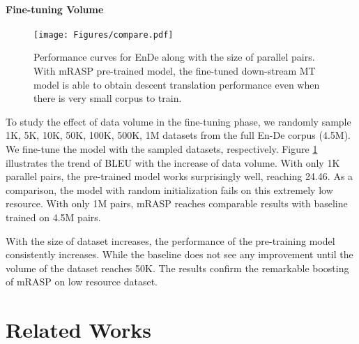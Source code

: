 \documentclass[11pt,a4paper]{article}
\newcommand{\method}{mRASP\xspace}
\begin{document}
\paragraph{Fine-tuning Volume}
\begin{figure}[ht]
    \centering
    \texttt{[image: Figures/compare.pdf]}
    \caption{Performance curves for EnDe along with the size of parallel pairs. With \method pre-trained model, the fine-tuned down-stream MT model is able to obtain descent translation performance even when there is very small corpus to train. }
    \label{fig:compare}
\end{figure}

To study the effect of data volume in the fine-tuning phase, we randomly sample 1K, 5K, 10K, 50K, 100K, 500K, 1M datasets from the full En-De corpus (4.5M). We fine-tune the model with the sampled datasets, respectively. Figure \ref{fig:compare} illustrates the trend of BLEU with the increase of data volume. With only 1K parallel pairs, the pre-trained model works surprisingly well, reaching 24.46. As a comparison, the model with random initialization fails on this extremely low resource. 
With only 1M pairs, \method reaches comparable results with baseline trained on 4.5M pairs.

With the size of dataset increases, the performance of the pre-training model consistently increases. 
While the baseline does not see any improvement until the volume of the dataset reaches 50K. The results confirm the remarkable boosting of \method on low resource dataset.







 
\section{Related Works}
\label{sec:related}
\end{document}
